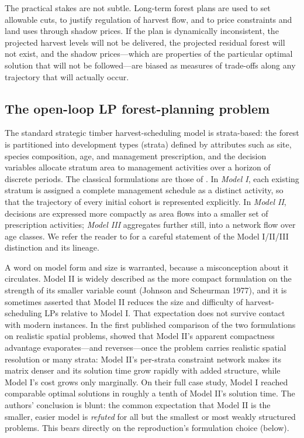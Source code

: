 The practical stakes are not subtle. Long-term forest plans are used to set allowable cuts, to justify regulation of harvest flow, and to price constraints and land uses through shadow prices. If the plan is dynamically inconsistent, the projected harvest levels will not be delivered, the projected residual forest will not exist, and the shadow prices---which are properties of the particular optimal solution that will not be followed---are biased as measures of trade-offs along any trajectory that will actually occur.

\hypertarget{the-open-loop-lp-forest-planning-problem}{%
\subsection{The open-loop LP forest-planning problem}\label{the-open-loop-lp-forest-planning-problem}}

The standard strategic timber harvest-scheduling model is strata-based: the forest is partitioned into development types (strata) defined by attributes such as site, species composition, age, and management prescription, and the decision variables allocate stratum area to management activities over a horizon of discrete periods. The classical formulations are those of \citet{johnson1977techniques}. In \emph{Model I}, each existing stratum is assigned a complete management schedule as a distinct activity, so that the trajectory of every initial cohort is represented explicitly. In \emph{Model II}, decisions are expressed more compactly as area flows into a smaller set of prescription activities; \emph{Model III} aggregates further still, into a network flow over age classes. We refer the reader to \citep[ch.~16]{gunn2007models} for a careful statement of the Model I/II/III distinction and its lineage.

A word on model form and size is warranted, because a misconception about it circulates. Model II is widely described as the more compact formulation on the strength of its smaller variable count (Johnson and Scheurman 1977), and it is sometimes asserted that Model II reduces the size and difficulty of harvest-scheduling LPs relative to Model I. That expectation does not survive contact with modern instances. In the first published comparison of the two formulations on realistic spatial problems, \citet{martin2017comparing} showed that Model II's apparent compactness advantage evaporates---and reverses---once the problem carries realistic spatial resolution or many strata: Model II's per-strata constraint network makes its matrix denser and its solution time grow rapidly with added structure, while Model I's cost grows only marginally. On their full case study, Model I reached comparable optimal solutions in roughly a tenth of Model II's solution time. The authors' conclusion is blunt: the common expectation that Model II is the smaller, easier model is \emph{refuted} for all but the smallest or most weakly structured problems. This bears directly on the reproduction's formulation choice (below).

